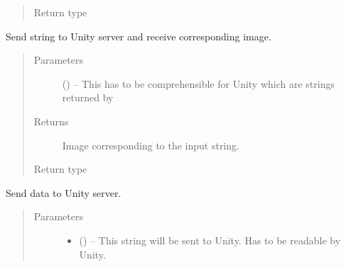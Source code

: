 \documentclass[letterpaper,10pt,english]{sphinxmanual}
\begin{document}
\begin{fulllineitems}
\begin{fulllineitems}
\begin{quote}
\begin{description}
\item[{Return type}] \leavevmode
{}

\end{description}\end{quote}

\end{fulllineitems}


\begin{fulllineitems}
\label{\detokenize{index:client.client_communicator_to_unity.receive_image}}
Send string to Unity server and receive corresponding image.
\begin{quote}\begin{description}
\item[{Parameters}] \leavevmode
{} () -- This  has to be comprehensible for Unity which are strings returned by {\hyperref[\detokenize{index:client.client_communicator_to_unity.write_json_crane}]{}}

\item[{Returns}] \leavevmode
Image corresponding to the input string.

\item[{Return type}] \leavevmode
{}

\end{description}\end{quote}

\end{fulllineitems}


\begin{fulllineitems}
\label{\detokenize{index:client.client_communicator_to_unity.send_to_unity}}
Send data to Unity server.
\begin{quote}\begin{description}
\item[{Parameters}] \leavevmode\begin{itemize}
\item {} 
 () -- This string will be sent to Unity. Has to be readable by Unity.


\end{itemize}
\end{description}
\end{quote}
\end{fulllineitems}
\end{fulllineitems}
\end{document}
